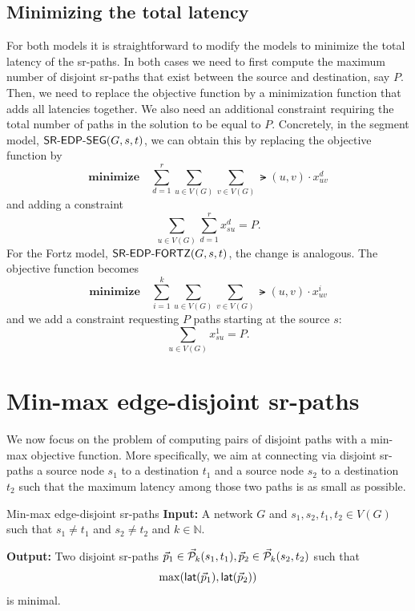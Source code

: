 \subsection{Minimizing the total latency}

For both models it is straightforward to modify the models to minimize the total latency of the sr-paths.
In both cases we need to first compute the maximum number of disjoint sr-paths that exist between the source
and destination, say $P$. Then, we need to replace the objective function by a minimization function that
adds all latencies together. We also need an additional constraint requiring the total number of paths in the solution to be equal to $P$.
Concretely, in the segment model, $\textsf{SR-EDP-SEG}(G, s, t)$, we can obtain this by replacing the objective function by
$$
\textbf{minimize} \quad \sum_{d = 1}^r \sum_{u \in V(G)} \sum_{v \in V(G)} \lat(u, v) \cdot x^d_{uv} 
$$
and adding a constraint
$$
\sum_{u \in V(G)} \sum_{d = 1}^r x^d_{su} = P. 
$$
For the Fortz model, $\textsf{SR-EDP-FORTZ}(G, s, t)$, the change is analogous. The objective function
becomes 
$$
\textbf{minimize} \quad \sum_{i = 1}^k \sum_{u \in V(G)} \sum_{v \in V(G)} \lat(u, v) \cdot x^i_{uv} 
$$
and we add a constraint requesting $P$ paths starting at the source $s$:
$$
\sum_{u \in V(G)} x^1_{su} = P. 
$$


\section{Min-max edge-disjoint sr-paths}

We now focus on the problem of computing pairs of disjoint paths with a min-max objective function. More
specifically, we aim at connecting via disjoint sr-paths a source node 
$s_1$ to a destination $t_1$ and a source node $s_2$ to a destination $t_2$
such that the maximum latency among those two paths is as small as possible.

\begin{problem}{Min-max edge-disjoint sr-paths}
\label{prob:disjointsrp}
\textbf{Input:} A network $G$ and $s_1, s_2, t_1, t_2 \in V(G)$ such that $s_1 \neq t_1$ and $s_2 \neq t_2$
and $k \in \mathbb{N}$.

\textbf{Output:} Two disjoint sr-paths $\vec{p}_1 \in \mathcal{\vec{P}}_k(s_1, t_1), \vec{p}_2 \in \mathcal{\vec{P}}_k(s_2, t_2)$ such that
$$
\max (\mathsf{lat}(\vec{p}_1), \mathsf{lat}(\vec{p}_2))
$$
is minimal.
\end{problem}

